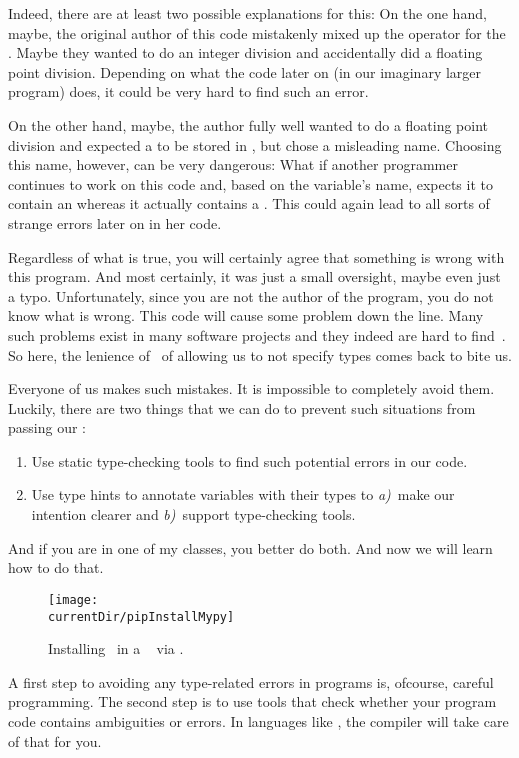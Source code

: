 Indeed, there are at least two possible explanations for this:
On the one hand, maybe, the original author of this code mistakenly mixed up the \pythonilIdx{/} operator for the \pythonilIdx{//}.
Maybe they wanted to do an integer division and accidentally did a floating point division.
Depending on what the code later on (in our imaginary larger program) does, it could be very hard to find such an error.

On the other hand, maybe, the author fully well wanted to do a floating point division and expected a  to be stored in , but chose a misleading name.
Choosing this name, however, can be very dangerous:
What if another programmer continues to work on this code and, based on the variable's name, expects it to contain an  whereas it actually contains a .
This could again lead to all sorts of strange errors later on in her code.

Regardless of what is true, you will certainly agree that something is wrong with this program.
And most certainly, it was just a small oversight, maybe even just a typo.
Unfortunately, since you are not the author of the program, you do not know what is wrong.
This code will cause some problem down the line.
Many such problems exist in many software projects and they indeed are hard to find~\cite{KCVM2022AESOTRDIPP}.
So here, the lenience of \python\ of allowing us to not specify types comes back to bite us.

Everyone of us makes such mistakes.
It is impossible to completely avoid them.
Luckily, there are two things that we can do to prevent such situations from passing our :%
%
\begin{enumerate}%
%
\item Use static type-checking tools to find such potential errors in our code.%
%
\item Use type hints to annotate variables with their types to \emph{a)}~make our intention clearer and \emph{b)}~support type-checking tools.%
%
\end{enumerate}%
%
And if you are in one of my classes, you better do both.
And now we will learn how to do that.%
\endhsection%
%
%
%
%
\begin{figure}%
\centering%
\texttt{[image: \\currentDir/pipInstallMypy]}%
\caption{Installing \mypy\ in a \ubuntu\  via \pip.}%
\label{fig:pipInstallMypy}%
\end{figure}%
%
%
%
%
%
A first step to avoiding any type-related errors in programs is, ofcourse, careful programming.
The second step is to use tools that check whether your program code contains ambiguities or errors.
In languages like , the compiler will take care of that for you.

